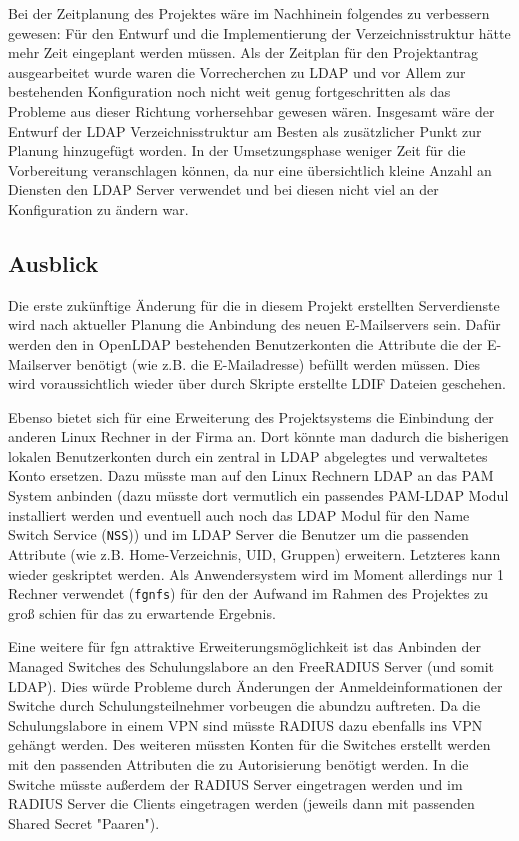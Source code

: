 \documentclass[11pt,a4paper,titlepage=firstiscover]{scrartcl} %
\begin{document}
Bei der Zeitplanung des Projektes wäre im Nachhinein folgendes zu verbessern gewesen: Für den Entwurf und die Implementierung der Verzeichnisstruktur hätte mehr Zeit eingeplant werden müssen. Als der Zeitplan für den Projektantrag ausgearbeitet wurde waren die Vorrecherchen zu LDAP und vor Allem zur bestehenden Konfiguration noch nicht weit genug fortgeschritten als das Probleme aus dieser Richtung vorhersehbar gewesen wären. Insgesamt wäre der Entwurf der LDAP Verzeichnisstruktur am Besten als zusätzlicher Punkt zur Planung hinzugefügt worden. In der Umsetzungsphase weniger Zeit für die Vorbereitung veranschlagen können, da nur eine übersichtlich kleine Anzahl an Diensten den LDAP Server verwendet und bei diesen nicht viel an der Konfiguration zu ändern war.

\subsection{Ausblick}
Die erste zukünftige Änderung für die in diesem Projekt erstellten Serverdienste wird nach aktueller Planung die Anbindung des neuen E-Mailservers sein. Dafür werden den in OpenLDAP bestehenden Benutzerkonten die Attribute die der E-Mailserver benötigt (wie z.B. die E-Mailadresse) befüllt werden müssen. Dies wird voraussichtlich wieder über durch Skripte erstellte LDIF Dateien geschehen.

Ebenso bietet sich für eine Erweiterung des Projektsystems die Einbindung der anderen Linux Rechner in der Firma an. Dort könnte man dadurch die bisherigen lokalen Benutzerkonten durch ein zentral in LDAP abgelegtes und verwaltetes Konto ersetzen. Dazu müsste man auf den Linux Rechnern LDAP an das PAM System anbinden (dazu müsste dort vermutlich ein passendes PAM-LDAP Modul installiert werden und eventuell auch noch das LDAP Modul für den Name Switch Service (\texttt{NSS})) und im LDAP Server die Benutzer um die passenden Attribute (wie z.B. Home-Verzeichnis, UID, Gruppen) erweitern. Letzteres kann wieder geskriptet werden. Als Anwendersystem wird im Moment allerdings nur 1 Rechner verwendet (\texttt{fgnfs}) für den der Aufwand im Rahmen des Projektes zu groß schien für das zu erwartende Ergebnis.

Eine weitere für fgn attraktive Erweiterungsmöglichkeit ist das Anbinden der Managed Switches des Schulungslabore an den FreeRADIUS Server (und somit LDAP). Dies würde Probleme durch Änderungen der Anmeldeinformationen der Switche durch Schulungsteilnehmer vorbeugen die abundzu auftreten. Da die Schulungslabore in einem VPN sind müsste RADIUS dazu ebenfalls ins VPN gehängt werden. Des weiteren müssten Konten für die Switches erstellt werden mit den passenden Attributen die zu Autorisierung benötigt werden. In die Switche müsste außerdem der RADIUS Server eingetragen werden und im RADIUS Server die Clients eingetragen werden (jeweils dann mit passenden Shared Secret "Paaren").
\end{document}
